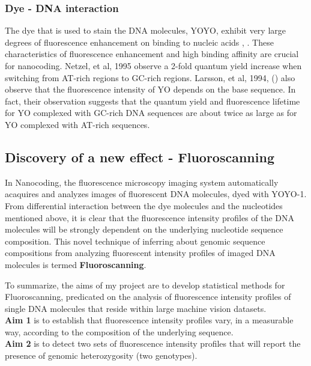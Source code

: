\subsubsection*{Dye - DNA interaction} 
The dye that is used to stain the DNA molecules, YOYO, exhibit very large degrees of fluorescence enhancement on binding to nucleic acids \cite{Rye_etal_1992_NAR}, \cite{Lee_etal_1986_Cytometry}. These  characteristics of fluorescence enhancement and  high binding affinity are crucial for nanocoding. Netzel, et al, 1995 \cite{Netzel_etal_1995_JPC} observe a 2-fold quantum yield increase when switching from AT-rich regions to GC-rich regions. Larsson, et al, 1994, (\cite{Larsson_etal_1994_JACS}) also observe that the fluorescence intensity of YO depends on the base sequence. In fact, their observation suggests that the quantum yield and fluorescence lifetime for YO complexed with GC-rich DNA sequences are about twice as large as for YO complexed with AT-rich sequences. 

\subsection{Discovery of a new effect - Fluoroscanning} \label{Aims}
In Nanocoding, the fluorescence microscopy imaging system automatically acaquires and analyzes images of fluorescent DNA molecules, dyed with YOYO-1. From differential interaction between the dye molecules and the nucleotides mentioned above, it is clear that the fluorescence intensity profiles of the DNA molecules will be strongly dependent on the underlying nucleotide sequence composition. This novel technique of inferring about genomic sequence compositions from analyzing fluorescent intensity profiles of imaged DNA molecules is termed {\bf{Fluoroscanning}}. 

To summarize, the aims of my project are to develop statistical methods for Fluoroscanning, predicated on the analysis of fluorescence intensity profiles of single DNA molecules that reside within large machine vision datasets.\\
\noindent
{\bf{Aim 1}} is to establish that fluorescence intensity profiles vary, in a measurable way, according to the composition of the underlying sequence. \\
\noindent
{\bf{Aim 2}} is to detect two sets of fluorescence intensity profiles that will report the presence of genomic heterozygosity (two genotypes).



